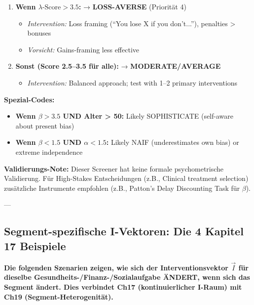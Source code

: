 \begin{tcolorbox}[colback=blue!5!white, colframe=blue!75!black, title=\textbf{Segment Screener: 10 Fragen, 2 Min Administrationszeit}]
\begin{enumerate}
\item \textbf{Wenn $\lambda\text{-Score} > 3.5$:} → \textbf{LOSS-AVERSE} (Priorität 4)
  \begin{itemize}[nosep]
  \item \textit{Intervention:} Loss framing (``You lose X if you don't...''), penalties > bonuses
  \item \textit{Vorsicht:} Gains-framing less effective
  \end{itemize}

\item \textbf{Sonst (Score 2.5--3.5 für alle):} → \textbf{MODERATE/AVERAGE}
  \begin{itemize}[nosep]
  \item \textit{Intervention:} Balanced approach; test with 1--2 primary interventions
  \end{itemize}
\end{enumerate}

\textbf{Spezial-Codes:}
\begin{itemize}[nosep]
\item \textbf{Wenn $\beta > 3.5$ UND Alter > 50:} Likely SOPHISTICATE (self-aware about present bias)
\item \textbf{Wenn $\beta < 1.5$ UND $\alpha < 1.5$:} Likely NAIF (underestimates own bias) or extreme independence
\end{itemize}

\end{tcolorbox}

\textbf{Validierungs-Note:} Dieser Screener hat keine formale psychometrische Validierung. Für High-Stakes Entscheidungen (z.B., Clinical treatment selection) zusätzliche Instrumente empfohlen (z.B., Patton's Delay Discounting Task für $\beta$).

---

\subsection{Segment-spezifische I-Vektoren: Die 4 Kapitel 17 Beispiele}

\textbf{Die folgenden Szenarien zeigen, wie sich der Interventionsvektor $\vec{I}$ für dieselbe Gesundheits-/Finanz-/Sozialaufgabe ÄNDERT, wenn sich das Segment ändert. Dies verbindet Ch17 (kontinuierlicher I-Raum) mit Ch19 (Segment-Heterogenität).}

